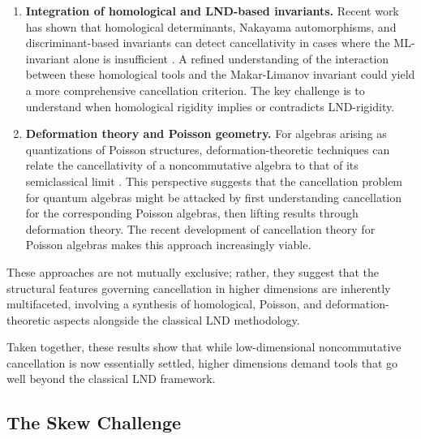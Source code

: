 \documentclass{amsart}
\theoremstyle{plain}
\numberwithin{theorem}{section}
\numberwithin{equation}{theorem}
\theoremstyle{definition}
\begin{document}
\begin{enumerate}

\item \textbf{Integration of homological and LND-based invariants.}
Recent work has shown that homological determinants, Nakayama automorphisms, and discriminant-based invariants can detect cancellativity in cases where the ML-invariant alone is insufficient \cite{ CPWZ1, CPWZ2,GKM,GWY2, LeWZ}. A refined understanding of the interaction between these homological tools and the Makar-Limanov invariant could yield a more comprehensive cancellation criterion. The key challenge is to understand when homological rigidity implies or contradicts LND-rigidity.

\item \textbf{Deformation theory and Poisson geometry.}
For algebras arising as quantizations of Poisson structures, deformation-theoretic techniques can relate the cancellativity of a noncommutative algebra to that of its semiclassical limit \cite{GW}. This perspective suggests that the cancellation problem for quantum algebras might be attacked by first understanding cancellation for the corresponding Poisson algebras, then lifting results through deformation theory. The recent development of cancellation theory for Poisson algebras \cite{GW, GWY1} makes this approach increasingly viable.
\end{enumerate}

These approaches are not mutually exclusive; rather, they suggest that the structural features governing cancellation in higher dimensions are inherently multifaceted, involving a synthesis of homological, Poisson, and deformation-theoretic aspects alongside the classical LND methodology.

Taken together, these results show that while low-dimensional noncommutative
cancellation is now essentially settled, higher dimensions demand tools that go
well beyond the classical LND framework.


\subsection{The Skew Challenge}
\end{document}

